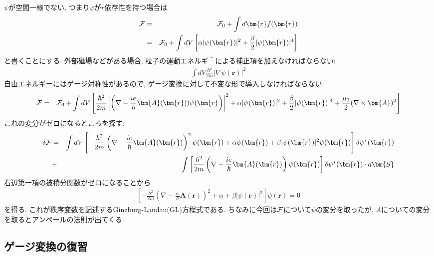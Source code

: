 \documentclass[10.5pt,a4paper]{jreport}
\begin{document}
$\psi$が空間一様でない, つまり$\psi$が$r$依存性を持つ場合は
\begin{eqnarray}
  {\cal F} &=& {\cal F}_0 + \int d\bm{r} f(\bm{r})\\
  &=& {\cal F}_0 + \int dV\left[\alpha|\psi(\bm{r})|^2 + \frac{\beta}{2}|\psi(\bm{r})|^4\right]  
\end{eqnarray}
と書くことにする. 外部磁場などがある場合, 粒子の運動エネルギ＾による補正項を加えなければならない:
\begin{eqnarray}
  \int dV \frac{\hbar^2}{2m}|\nabla\psi(\bm{r})|^2
\end{eqnarray}
自由エネルギーにはゲージ対称性があるので, ゲージ変換に対して不変な形で導入しなければならない:
\begin{eqnarray}
  {\cal F} &=& {\cal F}_0 + \int dV\left[\frac{\hbar^2}{2m}\left|\left(\nabla - \frac{ie}{\hbar}\bm{A}(\bm{r}))\psi(\bm{r}\right)\right|^2 + \alpha|\psi(\bm{r})|^2 + \frac{\beta}{2}|\psi(\bm{r})|^4 + \frac{\mu_0}{2}(\nabla\times\bm{A})^2\right]
\end{eqnarray}
これの変分がゼロになるところを探す:
\begin{eqnarray}
  \nonumber  \delta{\cal F} &=&\int dV\left[-\frac{\hbar^2}{2m}\left(\nabla - \frac{ie}{\hbar}\bm{A}(\bm{r})\right)^2\psi(\bm{r}) + \alpha\psi(\bm{r}) + \beta|\psi(\bm{r})|^2\psi(\bm{r})\right]\delta\psi^*(\bm{r})\\
  &+&\int \left[\frac{\hbar^2}{2m}\left(\nabla - \frac{ie}{\hbar}\bm{A}(\bm{r})\right)\psi(\bm{r})\right]\delta\psi^*(\bm{r})\cdot d\bm{S}
\end{eqnarray}
右辺第一項の被積分関数がゼロになることから
\begin{eqnarray}
  \left[-\frac{\hbar^2}{2m}\left(\nabla - \frac{ie}{\hbar}\bm{A}(\bm{r})\right)^2 + \alpha + \beta|\psi(\bm{r})|^2\right]\psi(\bm{r}) = 0\label{GL}
\end{eqnarray}
を得る. これが秩序変数を記述するGinzburg-Landau(GL)方程式である. ちなみに今回は${\cal F}$について$\psi$の変分を取ったが, $A$についての変分を取るとアンペールの法則が出てくる.
\subsection{ゲージ変換の復習}
\end{document}
